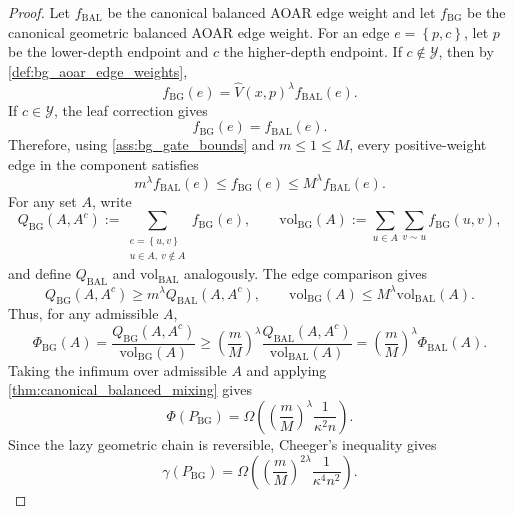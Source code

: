 \documentclass{article}
\numberwithin{theorem}{section}
\numberwithin{proposition}{section}
\numberwithin{corollary}{section}
\numberwithin{lemma}{section}
\numberwithin{conjecture}{section}
\numberwithin{remark}{section}
\numberwithin{definition}{section}
\numberwithin{assumption}{section}
\numberwithin{example}{section}
\newcommand{\calY}{{\mathcal{Y}}}
\newcommand{\mbra}[1]{\left\{#1\right\}}
\begin{document}
\begin{proof}
Let $f_{\mathrm{BAL}}$ be the canonical balanced AOAR edge weight and let $f_{\mathrm{BG}}$ be the canonical geometric balanced AOAR edge weight. For an edge $e=\mbra{p,c}$, let $p$ be the lower-depth endpoint and $c$ the higher-depth endpoint. If $c\notin\calY$, then by \cref{def:bg_aoar_edge_weights},
\begin{equation*}
    f_{\mathrm{BG}}(e)
    =
    \widehat V(x,p)^\lambda f_{\mathrm{BAL}}(e).
\end{equation*}
If $c\in\calY$, the leaf correction gives
\begin{equation*}
    f_{\mathrm{BG}}(e)=f_{\mathrm{BAL}}(e).
\end{equation*}
Therefore, using \cref{ass:bg_gate_bounds} and $m\le 1\le M$, every positive-weight edge in the component satisfies
\begin{equation*}
    m^\lambda f_{\mathrm{BAL}}(e)
    \le
    f_{\mathrm{BG}}(e)
    \le
    M^\lambda f_{\mathrm{BAL}}(e).
\end{equation*}
For any set $A$, write
\begin{equation*}
    Q_{\mathrm{BG}}(A,A^c):=\sum_{\substack{e=\mbra{u,v}\\u\in A,\ v\notin A}}f_{\mathrm{BG}}(e),
    \qquad
    \mathrm{vol}_{\mathrm{BG}}(A):=\sum_{u\in A}\sum_{v\sim u}f_{\mathrm{BG}}(u,v),
\end{equation*}
and define $Q_{\mathrm{BAL}}$ and $\mathrm{vol}_{\mathrm{BAL}}$ analogously.
The edge comparison gives
\begin{equation*}
    Q_{\mathrm{BG}}(A,A^c)\ge m^\lambda Q_{\mathrm{BAL}}(A,A^c),
    \qquad
    \mathrm{vol}_{\mathrm{BG}}(A)\le M^\lambda\mathrm{vol}_{\mathrm{BAL}}(A).
\end{equation*}
Thus, for any admissible $A$,
\begin{equation*}
    \Phi_{\mathrm{BG}}(A)
    =
    \frac{Q_{\mathrm{BG}}(A,A^c)}{\mathrm{vol}_{\mathrm{BG}}(A)}
    \ge
    \left(\frac{m}{M}\right)^\lambda
    \frac{Q_{\mathrm{BAL}}(A,A^c)}{\mathrm{vol}_{\mathrm{BAL}}(A)}
    =
    \left(\frac{m}{M}\right)^\lambda
    \Phi_{\mathrm{BAL}}(A).
\end{equation*}
Taking the infimum over admissible $A$ and applying \cref{thm:canonical_balanced_mixing} gives
\begin{equation*}
    \Phi(P_{\mathrm{BG}})
    =
    \Omega\!\left(
        \left(\frac{m}{M}\right)^\lambda
        \frac{1}{\kappa^2 n}
    \right).
\end{equation*}
Since the lazy geometric chain is reversible, Cheeger's inequality gives
\begin{equation*}
    \gamma(P_{\mathrm{BG}})
    =
    \Omega\!\left(
        \left(\frac{m}{M}\right)^{2\lambda}
        \frac{1}{\kappa^4 n^2}
    \right).
\end{equation*}


\end{proof}
\end{document}
